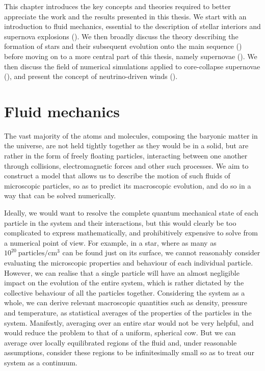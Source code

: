  \label{chap:theory}


This chapter introduces the key concepts and theories required to better appreciate the work and the results presented in this thesis. We start with an introduction to fluid mechanics, essential to the description of stellar interiors and supernova explosions (). We then broadly discuss the theory describing the formation of stars and their subsequent evolution onto the main sequence () before moving on to a more central part of this thesis, namely supernovae (). We then discuss the field of numerical simulations applied to core-collapse supernovae (), and present the concept of neutrino-driven winds ().

\section{Fluid mechanics} \label{sec:fluid_mech}

The vast majority of the atoms and molecules, composing the baryonic matter in the universe, are not held tightly together as they would be in a solid, but are rather in the form of freely floating particles, interacting between one another through collisions, electromagnetic forces and other such processes. We aim to construct a model that allows us to describe the motion of such fluids of microscopic particles, so as to predict its macroscopic evolution, and do so in a way that can be solved numerically.

Ideally, we would want to resolve the complete quantum mechanical state of each particle in the system and their interactions, but this would clearly be too complicated to express mathematically, and prohibitively expensive to solve from a numerical point of view. For example, in a star, where as many as \(10^{20}\ \mathrm{particles/cm^{3}}\) can be found just on its surface, we cannot reasonably consider evaluating the microscopic properties and behaviour of each individual particle. However, we can realise that a single particle will have an almost negligible impact on the evolution of the entire system, which is rather dictated by the collective behaviour of all the particles together. Considering the system as a whole, we can derive relevant macroscopic quantities such as density, pressure and temperature, as statistical averages of the properties of the particles in the system. Manifestly, averaging over an entire star would not be very helpful, and would reduce the problem to that of a uniform, spherical cow. But we can average over locally equilibrated regions of the fluid and, under reasonable assumptions, consider these regions to be infinitesimally small so as to treat our system as a continuum.


